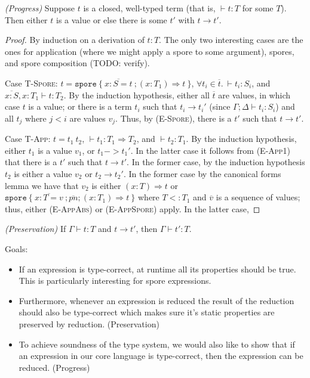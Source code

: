 \documentclass{llncs}
\newcommand{\seq}[1]{\overline{#1}}
\begin{document}
\begin{theorem}
\emph{(Progress)}
\label{th:progress}
Suppose $t$ is a closed, well-typed term (that is, $\vdash t : T$ for some $T$). Then either $t$ is a value or else there is some $t'$ with $t \rightarrow t'$.
\end{theorem}
\begin{proof}
By induction on a derivation of $t : T$. The only two interesting cases are the ones for application (where we might apply a spore to some argument), spores, and spore composition (TODO: verify).

Case \textsc{T-Spore}: $t = \texttt{spore}~\{~\seq{x : S = t}~; (x: T_1) \Rightarrow t~\}$, $\forall t_i \in \seq{t}.~\vdash t_i : S_i$, and $\seq{x : S}, x : T_1 \vdash t : T_2$. By the induction hypothesis, either all $\seq{t}$ are values, in which case $t$ is a value; or there is a term $t_i$ such that $t_i \rightarrow t_i'$ (since $\Gamma ; \Delta \vdash t_i : S_i$) and all $t_j$ where $j < i$ are values $v_j$. Thus, by (\textsc{E-Spore}), there is a $t'$ such that $t \rightarrow t'$.

Case \textsc{T-App}: $t = t_1~t_2$, $\vdash t_1 : T_1 \Rightarrow T_2$, and $\vdash t_2 : T_1$. By the induction hypothesis, either $t_1$ is a value $v_1$, or $t_1 -> t_1'$. In the latter case it follows from (\textsc{E-App1}) that there is a $t'$ such that $t \rightarrow t'$. In the former case, by the induction hypothesis $t_2$ is either a value $v_2$ or $t_2 \rightarrow t_2'$. In the former case by the canonical forms lemma we have that $v_2$ is either $(x: T) \Rightarrow t$ or $\texttt{spore}~\{~\seq{x : T = v}~; \seq{pn} ; (x: T_1) \Rightarrow t~\}$ where $T <: T_1$ and $\seq{v}$ is a sequence of values; thus, either (\textsc{E-AppAbs}) or (\textsc{E-AppSpore}) apply. In the latter case, 

\end{proof}


\begin{theorem}
\emph{(Preservation)}
\label{th:pres}
If $\Gamma \vdash t : T$ and $t \rightarrow t'$, then $\Gamma \vdash t' : T$.
\end{theorem}


Goals:
\begin{itemize}
\item If an expression is type-correct, at runtime all its properties should be true. This is particularly 
  interesting for spore expressions.
\item Furthermore, whenever an expression is reduced the result of the reduction should also be type-correct which 
  makes sure it's static properties are preserved by reduction. (Preservation)
\item To achieve soundness of the type system, we would also like to show that if an expression in our core 
  language is type-correct, then the expression can be reduced. (Progress)
\end{itemize}
  
\end{document}
